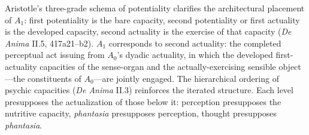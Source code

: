 Aristotle's three-grade schema of potentiality clarifies the architectural placement of $A_1$: first potentiality is the bare capacity, second potentiality or first actuality is the developed capacity, second actuality is the exercise of that capacity (\textit{De Anima} II.5, 417a21--b2). $A_1$ corresponds to second actuality: the completed perceptual act issuing from $A_0$'s dyadic actuality, in which the developed first-actuality capacities of the sense-organ and the actually-exercising sensible object---the constituents of $A_0$---are jointly engaged. The hierarchical ordering of psychic capacities (\textit{De Anima} II.3) reinforces the iterated structure. Each level presupposes the actualization of those below it: perception presupposes the nutritive capacity, \textit{phantasia} presupposes perception, thought presupposes \textit{phantasia}.

